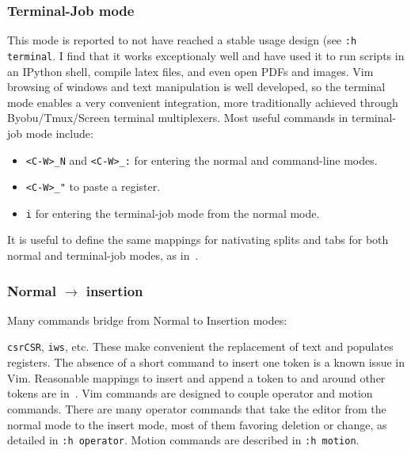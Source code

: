 \documentclass{article}
\newcommand{\tttt}[1] {
	\texttt{#1}}
\begin{document}
\subsubsection{Terminal-Job mode}\label{terminal}
This mode is reported to not have reached a stable usage design
(see \tttt{:h terminal}.
I find that it works exceptionaly well and have used it to run
scripts in an IPython shell, compile latex files, and even open PDFs and images.
Vim browsing of windows and text manipulation is well developed,
so the terminal mode enables a very convenient integration,
more traditionally achieved through Byobu/Tmux/Screen terminal
multiplexers.
Most useful commands in terminal-job mode include:
\begin{itemize}
  \item \tttt{<C-W>\_N} and \tttt{<C-W>\_:} for entering the normal
    and command-line modes.
  \item \tttt{<C-W>\_"} to paste a register.
  \item \tttt{i} for entering the terminal-job mode from the normal mode.
\end{itemize}

It is useful to define the same mappings for nativating splits and tabs
for both normal and terminal-job modes, as in~\cite{vimrc}.

\subsubsection{Normal $\rightarrow$ insertion}\label{navIn}
Many commands bridge from Normal to Insertion modes:
\tttt{csrCSR}, \tttt{iws}, etc.
These make convenient the replacement of text and populates registers.
The absence of a short command to insert one token is
a known issue in Vim.
Reasonable mappings to insert and append a token to and around
other tokens are in~\cite{vimrc}.
Vim commands are designed to couple operator and motion commands.
There are many operator commands that take the editor from
the normal mode to the insert mode, most of them
favoring deletion or change, as detailed in \tttt{:h operator}.
Motion commands are described in \tttt{:h motion}.
\end{document}
